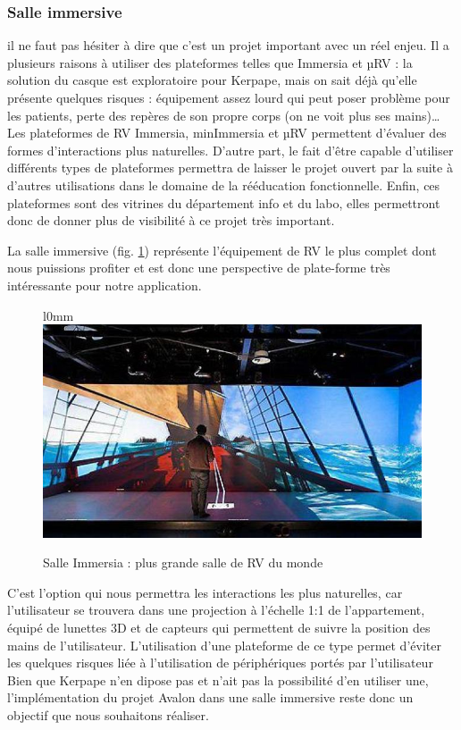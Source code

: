 \subsubsection{Salle immersive}

il ne faut pas hésiter à dire que c’est un projet important avec un réel enjeu.
Il a plusieurs raisons à utiliser des plateformes telles que Immersia et µRV : la solution du casque est exploratoire pour Kerpape,
mais on sait déjà qu’elle présente quelques risques  : équipement assez lourd qui peut poser problème pour les patients, perte des repères de son propre corps (on ne voit plus ses mains)… 
Les plateformes de RV Immersia, minImmersia et µRV permettent d’évaluer des formes d’interactions plus naturelles. 
D’autre part, le fait d’être capable d’utiliser différents types de plateformes permettra de laisser le projet ouvert par la suite à d’autres utilisations dans le domaine de la rééducation fonctionnelle. 
Enfin, ces plateformes sont des vitrines du département info et du labo, elles permettront donc de donner plus de visibilité à ce projet très important.


La salle immersive (fig. \ref{immersiaaaaaaaa}) représente l'équipement de RV le plus complet dont nous puissions profiter et est donc une perspective de plate-forme très intéressante pour notre application.
\begin{figure}{l}{0mm}
	\centering
	\includegraphics[scale=0.5]{2-Specifications/img-utilisateur/immersia.jpg}
	\caption{Salle Immersia : plus grande salle de RV du monde}
	\label{immersiaaaaaaaa}
\end{figure}
C'est l'option qui nous permettra les interactions les plus naturelles, car l'utilisateur se trouvera dans une projection à l'échelle 1:1 de l'appartement, équipé de lunettes 3D et de capteurs qui permettent de suivre la position des mains de l'utilisateur. \newline
L'utilisation d'une plateforme de ce type permet d'éviter les quelques risques liée à l'utilisation de périphériques portés par l'utilisateur
Bien que Kerpape n'en dipose pas et n'ait pas la possibilité d'en utiliser une, l'implémentation du projet Avalon dans une salle immersive reste donc un objectif que nous souhaitons réaliser.



